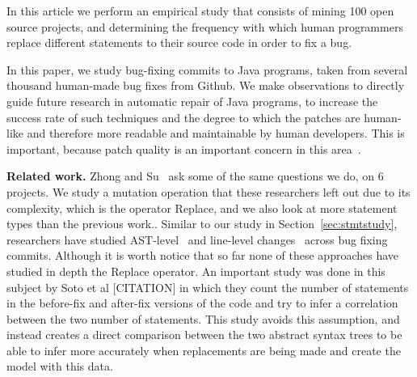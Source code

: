 \documentclass{sig-alternate-05-2015}
\begin{document}
In this article we perform an empirical study that consists of mining 100 open source projects, and determining the frequency with which human programmers replace different statements to their source code in order to fix a bug.



In this paper, we study bug-fixing commits to Java programs, 
taken from several thousand human-made bug fixes from Github. We make
observations to directly guide future research in automatic repair of Java
programs, to increase the success rate of such techniques and the degree to
which the patches are human-like and therefore more readable and maintainable by
human developers. This is important, because patch quality is an important
concern in this area~\cite{Qi15}.


\vspace{1ex} \noindent\textbf{Related work.} Zhong and Su~\cite{zhong2015} ask
some of the same questions we do, on 6 projects. We study a mutation operation that these researchers left out due to its complexity, which is the operator Replace, and we also look at more statement types than the previous work.. Similar to our study in
Section~\ref{sec:stmtstudy}, researchers have 
studied AST-level~\cite{Martinez:2015ez} and line-level
changes~\cite{Asaduzzaman:2013df} across bug fixing commits.
Although it is worth notice that so far none of these approaches have studied in depth the Replace operator.
An important study was done in this subject by Soto et al [CITATION] in which they count the number of statements in the before-fix and after-fix versions of the code and try to infer a correlation between the two number of statements. This study avoids this assumption, and instead creates a direct comparison between the two abstract syntax trees to be able to infer more accurately when replacements are being made and create the model with this data.
\end{document}
